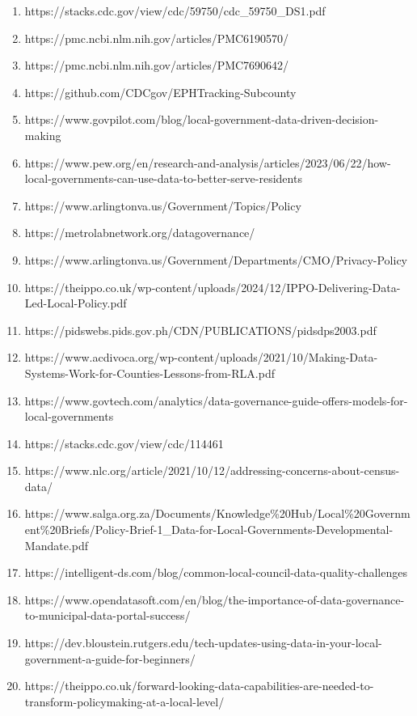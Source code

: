 \documentclass[
  letterpaper,
  DIV=11,
  numbers=noendperiod]{scrartcl}
\begin{document}
\begin{enumerate}
\def\labelenumi{\arabic{enumi}.}
\item
  https://stacks.cdc.gov/view/cdc/59750/cdc\_59750\_DS1.pdf
\item
  https://pmc.ncbi.nlm.nih.gov/articles/PMC6190570/
\item
  https://pmc.ncbi.nlm.nih.gov/articles/PMC7690642/
\item
  https://github.com/CDCgov/EPHTracking-Subcounty
\item
  https://www.govpilot.com/blog/local-government-data-driven-decision-making
\item
  https://www.pew.org/en/research-and-analysis/articles/2023/06/22/how-local-governments-can-use-data-to-better-serve-residents
\item
  https://www.arlingtonva.us/Government/Topics/Policy
\item
  https://metrolabnetwork.org/datagovernance/
\item
  https://www.arlingtonva.us/Government/Departments/CMO/Privacy-Policy
\item
  https://theippo.co.uk/wp-content/uploads/2024/12/IPPO-Delivering-Data-Led-Local-Policy.pdf
\item
  https://pidswebs.pids.gov.ph/CDN/PUBLICATIONS/pidsdps2003.pdf
\item
  https://www.acdivoca.org/wp-content/uploads/2021/10/Making-Data-Systems-Work-for-Counties-Lessons-from-RLA.pdf
\item
  https://www.govtech.com/analytics/data-governance-guide-offers-models-for-local-governments
\item
  https://stacks.cdc.gov/view/cdc/114461
\item
  https://www.nlc.org/article/2021/10/12/addressing-concerns-about-census-data/
\item
  https://www.salga.org.za/Documents/Knowledge\%20Hub/Local\%20Government\%20Briefs/Policy-Brief-1\_Data-for-Local-Governments-Developmental-Mandate.pdf
\item
  https://intelligent-ds.com/blog/common-local-council-data-quality-challenges
\item
  https://www.opendatasoft.com/en/blog/the-importance-of-data-governance-to-municipal-data-portal-success/
\item
  https://dev.bloustein.rutgers.edu/tech-updates-using-data-in-your-local-government-a-guide-for-beginners/
\item
  https://theippo.co.uk/forward-looking-data-capabilities-are-needed-to-transform-policymaking-at-a-local-level/

\end{enumerate}
\end{document}

